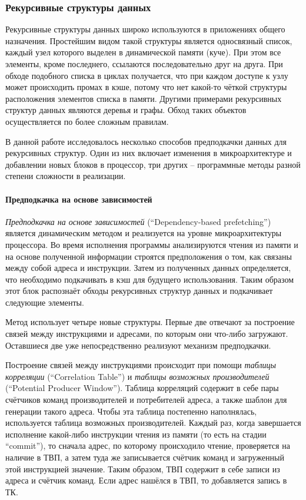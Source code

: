 \documentclass[12pt,a4paper]{article}
\begin{document}
\subsubsection{Рекурсивные структуры данных}

\indent

Рекурсивные структуры данных широко используются в приложениях общего назначения\cite{LukPhd}. Простейшим видом такой структуры является односвязный список, каждый узел которого выделен в динамической памяти (куче). При этом все элементы, кроме последнего, ссылаются последовательно друг на друга. При обходе подобного списка в циклах получается, что при каждом доступе к узлу может происходить промах в кэше, потому что нет какой-то чёткой структуры расположения элементов списка в памяти. Другими примерами рекурсивных структур данных являются деревья и графы. Обход таких объектов осуществляется по более сложным правилам.

В данной работе исследовалось несколько способов предподкачки данных для рекурсивных структур. Один из них включает изменения в микроархитектуре и добавлении новых блоков в процессор, три других -- программные методы разной степени сложности в реализации.

\paragraph{Предподкачка на основе зависимостей}

\emph{Предподкачка на основе зависимостей} (``Dependency-based prefetching'')\cite{Roth:1998} является динамическим методом и реализуется на уровне микроархитектуры процессора. Во время исполнения программы анализируются чтения из памяти и на основе полученной информации строятся предположения о том, как связаны между собой адреса и инструкции. Затем из полученных данных определяется, что необходимо подкачивать в кэш для будущего использования. Таким образом этот блок распознаёт обходы рекурсивных структур данных и подкачивает следующие элементы.

Метод использует четыре новые структуры. Первые две отвечают за построение связей между инструкциями и адресами, по которым они что-либо загружают. Оставшиеся две уже непосредственно реализуют механизм предподкачки.

Построение связей между инструкциями происходит при помощи \emph{таблицы корреляции} (``Correlation Table'') и \emph{таблицы возможных производителей} (``Potential Producer Window''). Таблица корреляций содержит в себе пары счётчиков команд производителей и потребителей адреса, а также шаблон для генерации такого адреса. Чтобы эта таблица постепенно наполнялась, используется таблица возможных производителей. Каждый раз, когда завершается исполнение какой-либо инструкции чтения из памяти (то есть на стадии ``commit''), то сначала адрес, по которому происходило чтение, проверяется на наличие в ТВП, а затем туда же записывается счётчик команд и загруженный этой инструкцией значение. Таким образом, ТВП содержит в себе записи из адреса и счётчик команд. Если адрес нашёлся в ТВП, то добавляется запись в ТК.
\end{document}
